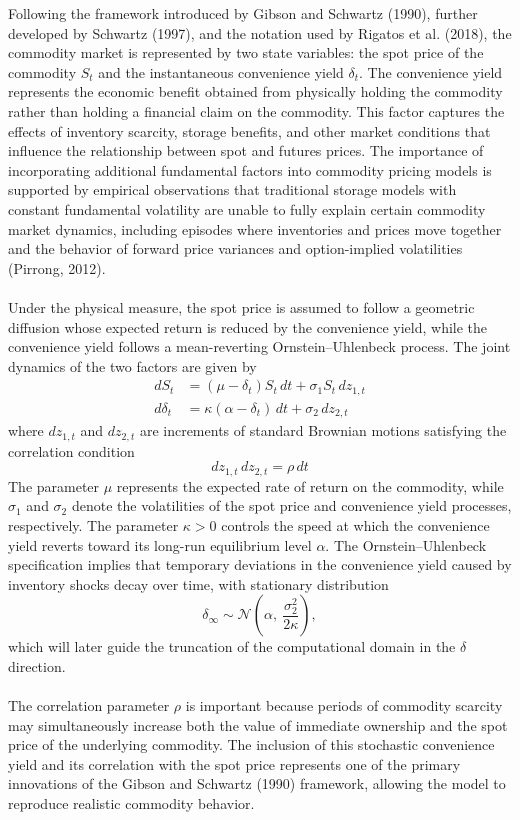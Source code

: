 \documentclass[12pt,a4paper]{article}
\begin{document}
Following the framework introduced by Gibson and Schwartz (1990), further developed by Schwartz (1997), and the notation used by Rigatos et al. (2018), the commodity market is represented by two state variables: the spot price of the commodity $S_t$ and the instantaneous convenience yield $\delta_t$. The convenience yield represents the economic benefit obtained from physically holding the commodity rather than holding a financial claim on the commodity. This factor captures the effects of inventory scarcity, storage benefits, and other market conditions that influence the relationship between spot and futures prices. The importance of incorporating additional fundamental factors into commodity pricing models is supported by empirical observations that traditional storage models with constant fundamental volatility are unable to fully explain certain commodity market dynamics, including episodes where inventories and prices move together and the behavior of forward price variances and option-implied volatilities (Pirrong, 2012).\\\\
Under the physical measure, the spot price is assumed to follow a geometric diffusion whose expected return is reduced by the convenience yield, while the convenience yield follows a mean-reverting Ornstein--Uhlenbeck process. The joint dynamics of the two factors are given by
\begin{align}
    dS_t &= (\mu-\delta_t)S_t\,dt+\sigma_1S_t\,dz_{1,t}\label{eq:S_real}\\
    d\delta_t &= \kappa(\alpha-\delta_t)\,dt+\sigma_2\,dz_{2,t}\label{eq:d_real}
\end{align}
where $dz_{1,t}$ and $dz_{2,t}$ are increments of standard Brownian motions satisfying the correlation condition
\begin{equation}
    dz_{1,t}\,dz_{2,t}=\rho\,dt\label{eq:corr}
\end{equation}
The parameter $\mu$ represents the expected rate of return on the commodity, while $\sigma_1$ and $\sigma_2$ denote the volatilities of the spot price and convenience yield processes, respectively. The parameter $\kappa>0$ controls the speed at which the convenience yield reverts toward its long-run equilibrium level $\alpha$. The Ornstein--Uhlenbeck specification implies that temporary deviations in the convenience yield caused by inventory shocks decay over time, with stationary distribution
\begin{equation}
    \delta_\infty\sim\mathcal{N}\!\left(\alpha,\ \frac{\sigma_2^2}{2\kappa}\right),
\end{equation}
which will later guide the truncation of the computational domain in the $\delta$ direction.\\\\
The correlation parameter $\rho$ is important because periods of commodity scarcity may simultaneously increase both the value of immediate ownership and the spot price of the underlying commodity. The inclusion of this stochastic convenience yield and its correlation with the spot price represents one of the primary innovations of the Gibson and Schwartz (1990) framework, allowing the model to reproduce realistic commodity behavior.
\end{document}
